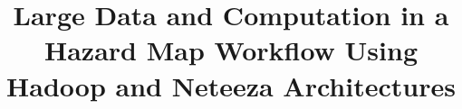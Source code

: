 \documentclass{acm_proc_article-sp}
\begin{document}
\title{Large Data and Computation in a Hazard Map Workflow Using Hadoop and Neteeza Architectures}
%
%
%
%
%
\end{document}
